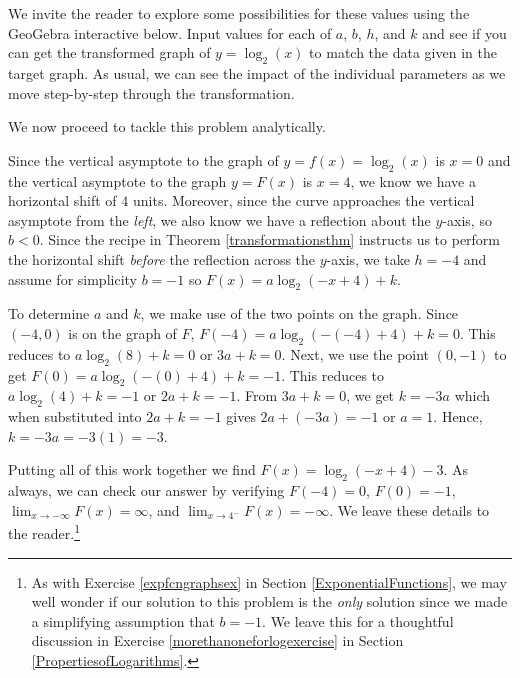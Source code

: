 \documentclass{ximera}
\begin{document}
\begin{example}
\begin{explanation}
\begin{enumerate}
We invite the reader to explore some possibilities for these values using the GeoGebra interactive below.  Input values for each of $a$, $b$, $h$, and $k$ and see if you can get the transformed graph of $y=\log_{2}(x)$ to match the data given in the target graph.  As usual, we can see the impact of the individual parameters as we move step-by-step through the transformation. 


\begin{center}
\end{center}


We now proceed to tackle this problem analytically.

Since the vertical asymptote to the graph of $y=f(x) = \log_{2}(x)$ is $x=0$ and the vertical asymptote to the graph $y = F(x)$ is $x=4$, we know we have a horizontal shift of $4$ units. Moreover, since the curve approaches the vertical asymptote from the \textit{left}, we also know we have a reflection about the $y$-axis, so $b<0$.  Since the recipe in Theorem \ref{transformationsthm} instructs us to perform the horizontal shift \textit{before} the reflection across the $y$-axis, we take $h=-4$ and assume for simplicity $b = -1$ so $F(x) = a \log_{2}(-x+4)+k$.  

 

To determine $a$ and $k$, we make use of the two points on the graph.  Since $(-4,0)$ is on the graph of $F$, $F(-4) = a \log_{2}(-(-4)+4) + k = 0$.  This reduces to $a \log_{2}(8)+k = 0$ or $3a+k=0$.  Next, we use the point $(0,-1)$ to get $F(0) = a \log_{2}(-(0)+4) +k = -1$. This reduces to $a \log_{2}(4) + k = -1$ or $2a+k = -1$.  From $3a+k=0$, we get $k=-3a$ which when substituted into $2a+k=-1$ gives $2a +(-3a) = -1$ or $a = 1$.  Hence, $k = -3a = -3(1) = -3$.


 

Putting all of this work together we find $F(x) = \log_{2}(-x+4)-3$.  As always, we can check our answer by verifying $F(-4) = 0$, $F(0) = -1$, $\lim_{x \rightarrow -\infty} F(x) = \infty$, and $\lim_{x \rightarrow 4^{-}} F(x) =  -\infty$. We leave these details to the reader.\footnote{As with Exercise \ref{expfcngraphsex} in Section \ref{ExponentialFunctions},  we may well wonder if our solution to this problem  is the  \textit{only} solution since we made a simplifying assumption that $b=-1$.  We leave this for a thoughtful discussion in Exercise \ref{morethanoneforlogexercise} in Section \ref{PropertiesofLogarithms}.}



\end{enumerate}
\end{explanation}
\end{example}
\end{document}
